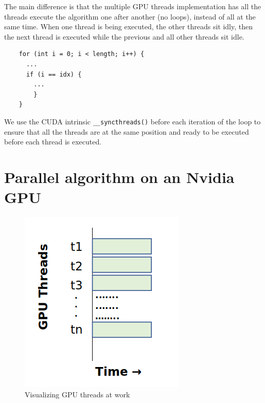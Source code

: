 \documentclass{article}
\begin{document}
\smallbreak
\noindent The main difference is that the multiple GPU threads implementation has all the threads execute the algorithm one after another (no loops), instead of all at the same time. When one thread is being executed, the other threads sit idly, then the next thread is executed while the previous and all other threads sit idle.
\begin{mdframed}[backgroundcolor=light-gray, roundcorner=10pt,leftmargin=0.5, rightmargin=0.5, innertopmargin=5,innerbottommargin=5, outerlinewidth=1, linecolor=light-gray]
\begin{verbatim}
    for (int i = 0; i < length; i++) {
      ...
      if (i == idx) {
        ... 
        }
    }
\end{verbatim}
\end{mdframed}
We use the CUDA intrinsic \texttt{__syncthreads()} before each iteration of the loop to ensure that all the threads are at the same position and ready to be executed before each thread is executed.

\section{Parallel algorithm on an Nvidia GPU}

\begin{figure}[H]
\hfill\includegraphics[scale=0.72]{Graphics/gpu.PNG}\hspace*{\fill}
\caption{Visualizing GPU threads at work}
\end{figure}
\end{document}
